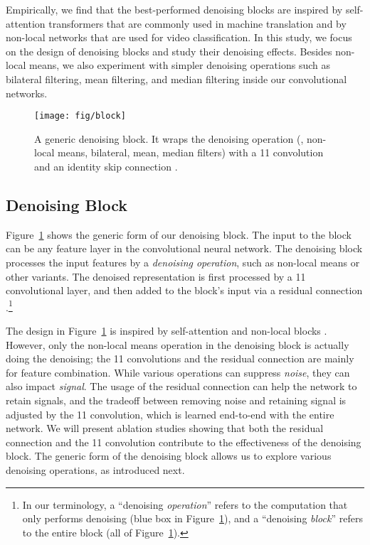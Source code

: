 \documentclass[10pt,twocolumn,letterpaper]{article}
\begin{document}
Empirically, we find that the best-performed denoising blocks are inspired by self-attention transformers \cite{Vaswani2017} that are commonly used in machine translation and by non-local networks \cite{Wang2018} that are used for video classification. In this study, we focus on the design of denoising blocks and study their denoising effects. Besides non-local means, we also experiment with simpler denoising operations such as bilateral filtering, mean filtering, and median filtering inside our convolutional networks.

\begin{figure}[t]
\centering
\texttt{[image: fig/block]}
\caption{A generic denoising block. It wraps the denoising operation (\eg, non-local means, bilateral, mean, median filters) with a 11 convolution and an identity skip connection \cite{He2016}.}
\label{fig:block}
\end{figure}


\subsection{Denoising Block}

Figure~\ref{fig:block} shows the generic form of our denoising block. The input to the block can be any feature layer in the convolutional neural network. The denoising block processes the input features by a \emph{denoising operation}, such as non-local means or other variants. The denoised representation is first processed by a 11 convolutional layer, and then added to the block's input via a residual connection \cite{He2016}.\footnote{In our terminology, a ``denoising \emph{operation}'' refers to the computation that only performs denoising (blue box in Figure~\ref{fig:block}), and a ``denoising \emph{block}'' refers to the entire block (all of Figure~\ref{fig:block}).}

The design in Figure~\ref{fig:block} is inspired by self-attention \cite{Vaswani2017} and non-local blocks \cite{Wang2018}. However, only the non-local means \cite{Buades2005} operation in the denoising block is actually doing the denoising; the 11 convolutions and the residual connection are mainly for feature combination. While various operations can suppress \emph{noise}, they can also impact \emph{signal}. The usage of the residual connection can help the network to retain signals, and the tradeoff between removing noise and retaining signal is adjusted by the 11 convolution, which is learned end-to-end with the entire network. We will present ablation studies showing that both the residual connection and the 11 convolution contribute to the effectiveness of the denoising block. The generic form of the denoising block allows us to explore various denoising operations, as introduced next.
\end{document}
